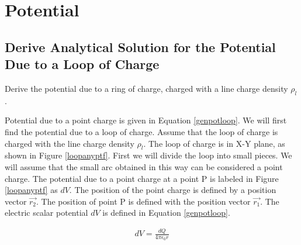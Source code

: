 \documentclass{ximera}
\begin{document}
\section{Potential}

\subsection{Derive Analytical Solution for the Potential  Due to a Loop of Charge }

Derive the potential due to a ring of charge, charged with a line charge density $\rho_l$. 


Potential due to a point charge is given in Equation \ref{genpotloop}. We will first find the potential due to a loop of charge. Assume that the loop of charge is charged with the line charge density $\rho_l$. The loop of charge is in X-Y plane, as shown in Figure \ref{loopanyptf}.  First we will divide the loop into small pieces. We will assume that the small  arc obtained in this way can be considered a point charge. The potential due to a point charge at a point P is labeled  in Figure \ref{loopanyptf} as $dV$.  The position of the point charge is defined by a position vector $\vec{r_2}$. The position of point P is defined with the position vector  $\vec{r_1}$. The electric scalar potential $dV$ is defined in  Equation  \ref{genpotloop}.


\begin{eqnarray}
dV=\frac{dQ}{4 \pi \epsilon_{0} {r}}  \label{genpotloop}
\end{eqnarray}
\end{document}
